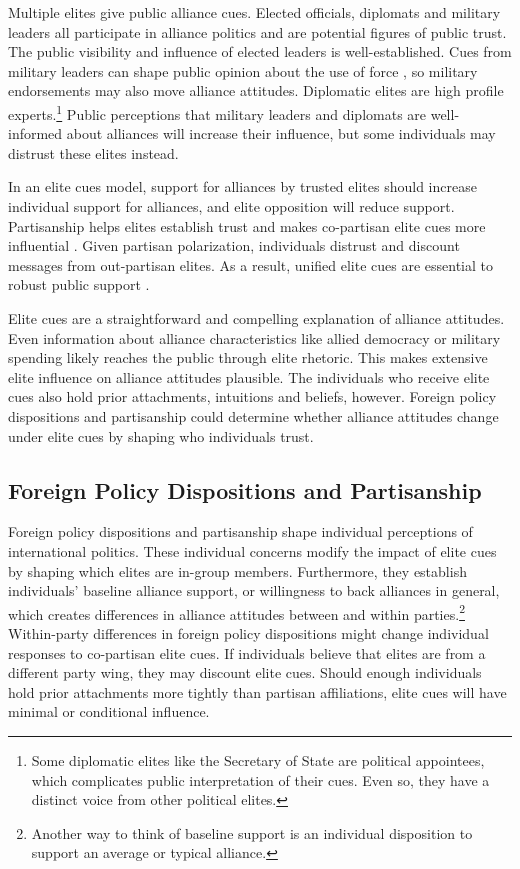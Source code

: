 \documentclass[12pt]{article}
\begin{document}
Multiple elites give public alliance cues.
Elected officials, diplomats and military leaders all participate in alliance politics and are potential figures of public trust.
The public visibility and influence of elected leaders is well-established.
Cues from military leaders can shape public opinion about the use of force \citep{Golbyetal2018}, so military endorsements may also move alliance attitudes. 
Diplomatic elites are high profile experts.\footnote{Some diplomatic elites like the Secretary of State are political appointees, which complicates public interpretation of their cues. Even so, they have a distinct voice from other political elites.}
Public perceptions that military leaders and diplomats are well-informed about alliances will increase their influence, but some individuals may distrust these elites instead.


In an elite cues model, support for alliances by trusted elites should increase individual support for alliances, and elite opposition will reduce support.   
Partisanship helps elites establish trust and makes co-partisan elite cues more influential \citep{Druckmanetal2013}.
Given partisan polarization, individuals distrust and discount messages from out-partisan elites.
As a result, unified elite cues are essential to robust public support \citep{Berinsky2007}.


Elite cues are a straightforward and compelling explanation of alliance attitudes.
Even information about alliance characteristics like allied democracy or military spending likely reaches the public through elite rhetoric. 
This makes extensive elite influence on alliance attitudes plausible. 
The individuals who receive elite cues also hold prior attachments, intuitions and beliefs, however.
Foreign policy dispositions and partisanship could determine whether alliance attitudes change under elite cues by shaping who individuals trust.


\subsection{Foreign Policy Dispositions and Partisanship}


Foreign policy dispositions and partisanship shape individual perceptions of international politics. 
These individual concerns modify the impact of elite cues by shaping which elites are in-group members.
Furthermore, they establish individuals' baseline alliance support, or willingness to back alliances in general, which creates differences in alliance attitudes between and within parties.\footnote{Another way to think of baseline support is an individual disposition to support an average or typical alliance.}
Within-party differences in foreign policy dispositions might change individual responses to co-partisan elite cues.
If individuals believe that elites are from a different party wing, they may discount elite cues.  
Should enough individuals hold prior attachments more tightly than partisan affiliations, elite cues will have minimal or conditional influence.
\end{document}
